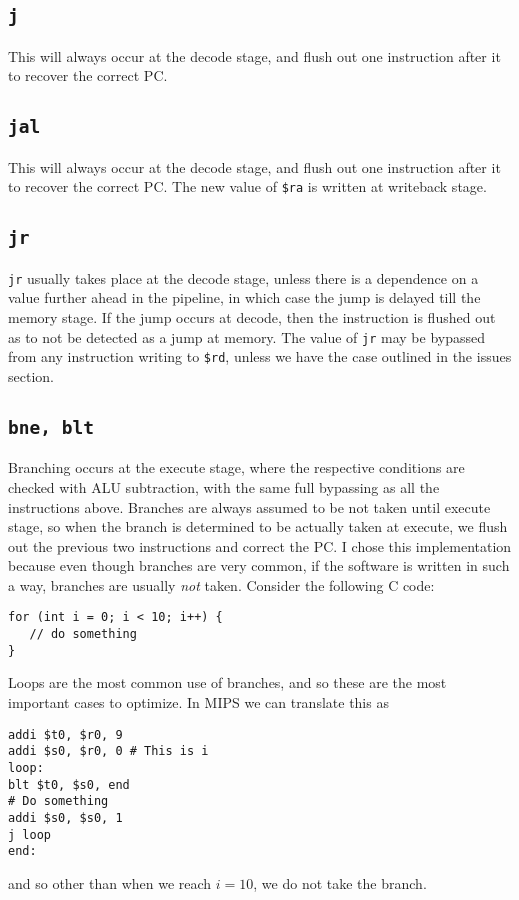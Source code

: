 \documentclass[letterpaper]{article} %
\begin{document}
\subsection*{\texttt{j}}
This will always occur at the decode stage, and flush out one instruction after it to recover the correct PC.
\subsection*{\texttt{jal}}
This will always occur at the decode stage, and flush out one instruction after it to recover the correct PC. The new value of \texttt{\$ra} is written at writeback stage.
\subsection*{\texttt{jr}}
\texttt{jr} usually takes place at the decode stage, unless there is a dependence on a value further ahead in the pipeline, in which case the jump is delayed till the memory stage. If the jump occurs at decode, then the instruction is flushed out as to not be detected as a jump at memory. The value of \texttt{jr} may be bypassed from any instruction writing to \texttt{\$rd}, unless we have the case outlined in the issues section.
\subsection*{\texttt{bne, blt}}
Branching occurs at the execute stage, where the respective conditions are checked with ALU subtraction, with the same full bypassing as all the instructions above. Branches are always assumed to be not taken until execute stage, so when the branch is determined to be actually taken at execute, we flush out the previous two instructions and correct the PC. I chose this implementation because even though branches are very common, if the software is written in such a way, branches are usually \textit{not} taken. Consider the following C code:
\begin{verbatim}
for (int i = 0; i < 10; i++) {
   // do something
}
\end{verbatim}
Loops are the most common use of branches, and so these are the most important cases to optimize. In MIPS we can translate this as
\begin{verbatim}
addi $t0, $r0, 9
addi $s0, $r0, 0 # This is i
loop:
blt $t0, $s0, end
# Do something
addi $s0, $s0, 1
j loop
end:
\end{verbatim}
and so other than when we reach $i=10$, we do not take the branch.
\end{document}
